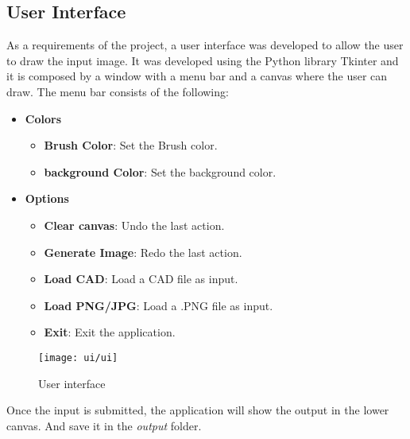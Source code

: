 \subsection{User Interface}\label{subsec:user-interface}
As a requirements of the project, a user interface was developed to allow the user to draw the input image.
It was developed using the Python library Tkinter and it is composed by a window with a menu bar and a canvas where the user can draw.
The menu bar consists of the following:
\begin{itemize}
    \item \textbf{Colors}
    \begin{itemize}
        \item \textbf{Brush Color}: Set the Brush color.
        \item \textbf{background Color}: Set the background color.
    \end{itemize}
    \item \textbf{Options}
    \begin{itemize}
        \item \textbf{Clear canvas}: Undo the last action.
        \item \textbf{Generate Image}: Redo the last action.
        \item \textbf{Load CAD}: Load a CAD file as input.
        \item \textbf{Load PNG/JPG}: Load a .PNG file as input.
        \item \textbf{Exit}: Exit the application.
    \end{itemize}
\end{itemize}
\begin{figure}[H]
    \centering
    \texttt{[image: ui/ui]}
    \caption{User interface}\label{fig:ui}
\end{figure}
Once the input is submitted, the application will show the output in the lower canvas.
And save it in the \textit{output} folder.
